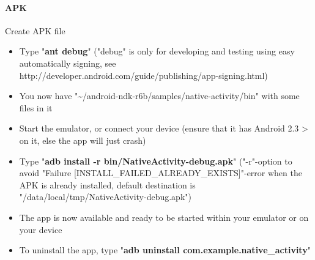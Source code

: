 \paragraph{\ac{APK}}
Create \ac{APK} file
\begin{itemize}
\item{Type "\textbf{ant debug}" ("debug" is only for developing and testing using easy automatically signing, see http://developer.android.com/guide/publishing/app-signing.html)}
\item{\textrightarrow{} You now have "\textasciitilde /android-ndk-r6b/samples/native-activity/bin" with some files in it}
\item{Start the emulator, or connect your device (ensure that it has Android 2.3 > on it, else the app will just crash)}
\item{Type "\textbf{adb install -r bin/NativeActivity-debug.apk}" ("-r"-option to avoid "Failure [INSTALL\_FAILED\_ALREADY\_EXISTS]"-error when the \ac{APK} is already installed, default destination is "/data/local/tmp/NativeActivity-debug.apk")}
\item{\textrightarrow{} The app is now available and ready to be started within your emulator or on your device}
\item{\textrightarrow{} To uninstall the app, type "\textbf{adb uninstall com.example.native\_activity}"}
\end{itemize}



